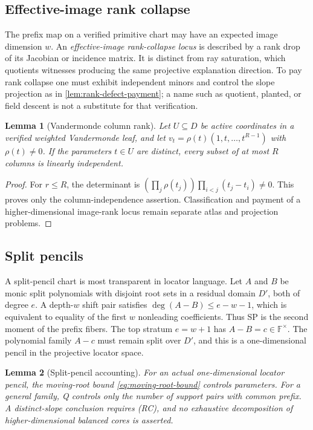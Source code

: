 \documentclass[12pt,a4paper]{amsart}
\numberwithin{equation}{section}
\newtheorem{lemma}[lemma]{Lemma}
\theoremstyle{remark}
\newcommand{\F}{\mathbb F}
\begin{document}
\subsection*{Effective-image rank collapse}
The prefix map on a verified primitive chart may have an expected image
dimension \(w\).  An \emph{effective-image rank-collapse locus} is
described by a rank drop of its Jacobian or incidence matrix.  It is
distinct from ray saturation, which quotients witnesses producing the same
projective explanation direction.  To pay rank collapse one must exhibit independent
minors and control the slope projection as in
\cref{lem:rank-defect-payment}; a name such as quotient, planted, or
field descent is not a substitute for that verification.

\begin{lemma}[Vandermonde column rank]\label{lem:vandermonde-image-rank-expanded}
Let \(U\subseteq D\) be active coordinates in a verified weighted
Vandermonde leaf, and let \(v_t=\rho(t)(1,t,\ldots,t^{R-1})\) with
\(\rho(t)\ne0\).  If the parameters \(t\in U\) are distinct, every subset
of at most \(R\) columns is linearly independent.
\end{lemma}

\begin{proof}
For \(r\le R\), the determinant is
\((\prod_j\rho(t_j))\prod_{i<j}(t_j-t_i)\ne0\).  This proves only the
column-independence assertion.  Classification and payment of a
higher-dimensional image-rank locus remain separate atlas and projection
problems.
\end{proof}

\subsection*{Split pencils}
A split-pencil chart is most transparent in locator language.  Let \(A\) and \(B\) be monic split polynomials with disjoint root sets in a residual domain \(D'\), both of degree \(e\).  A depth-\(w\) shift pair satisfies \(\deg(A-B)\le e-w-1\), which is equivalent to equality of the first \(w\) nonleading coefficients.  Thus SP is the second moment of the prefix fibers.  The top stratum \(e=w+1\) has \(A-B=c\in\F^\times\).  The polynomial family \(A-c\) must remain split over \(D'\), and this is a one-dimensional pencil in the projective locator space.

\begin{lemma}[Split-pencil accounting]\label{lem:split-pencil-alternatives-expanded}
For an actual one-dimensional locator pencil, the moving-root bound
\eqref{eq:moving-root-bound} controls parameters.  For a general family,
Q controls only the number of support pairs with common prefix.  A
distinct-slope conclusion requires \textup{(RC)}, and no exhaustive
decomposition of higher-dimensional balanced cores is asserted.
\end{lemma}
\end{document}
